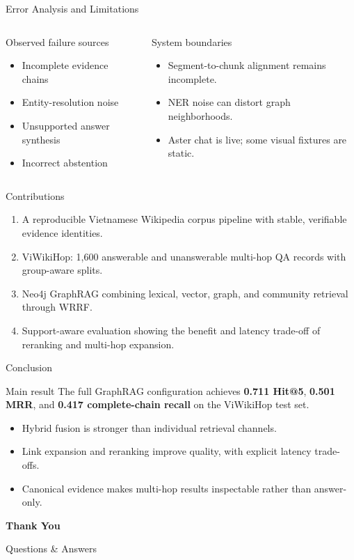 \documentclass[aspectratio=169]{beamer}
\newcommand{\best}[1]{\textcolor{fptOrange}{\textbf{#1}}}
\begin{document}
\begin{frame}{Error Analysis and Limitations}
\begin{columns}[T]
\begin{alertblock}{Observed failure sources}
\begin{itemize}
\item Incomplete evidence chains
\item Entity-resolution noise
\item Unsupported answer synthesis
\item Incorrect abstention
\end{itemize}
\end{alertblock}
\begin{block}{System boundaries}
\begin{itemize}
\item Segment-to-chunk alignment remains incomplete.
\item NER noise can distort graph neighborhoods.
\item Aster chat is live; some visual fixtures are static.
\end{itemize}
\end{block}
\end{columns}
\end{frame}

\begin{frame}{Contributions}
\begin{enumerate}
\item A reproducible Vietnamese Wikipedia corpus pipeline with stable, verifiable evidence identities.
\item ViWikiHop: 1,600 answerable and unanswerable multi-hop QA records with group-aware splits.
\item Neo4j GraphRAG combining lexical, vector, graph, and community retrieval through WRRF.
\item Support-aware evaluation showing the benefit and latency trade-off of reranking and multi-hop expansion.
\end{enumerate}
\end{frame}

\begin{frame}{Conclusion}
\begin{block}{Main result}
The full GraphRAG configuration achieves \best{0.711 Hit@5}, \best{0.501 MRR}, and \best{0.417 complete-chain recall} on the ViWikiHop test set.
\end{block}
\begin{itemize}
\item Hybrid fusion is stronger than individual retrieval channels.
\item Link expansion and reranking improve quality, with explicit latency trade-offs.
\item Canonical evidence makes multi-hop results inspectable rather than answer-only.
\end{itemize}
\end{frame}

\begin{frame}[plain]
\centering
\vfill
{\color{fptNavy}\LARGE\bfseries Thank You}\par\vspace{.3cm}
{\large Questions \& Answers}
\vfill
\end{frame}
\end{document}
